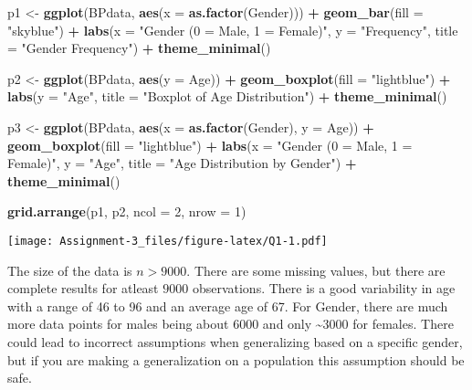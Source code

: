 \documentclass[
]{article}
\newenvironment{Shaded}{\begin{snugshade}}{\end{snugshade}}
\newcommand{\AttributeTok}[1]{\textcolor[rgb]{0.13,0.29,0.53}{#1}}
\newcommand{\DecValTok}[1]{\textcolor[rgb]{0.00,0.00,0.81}{#1}}
\newcommand{\FunctionTok}[1]{\textcolor[rgb]{0.13,0.29,0.53}{\textbf{#1}}}
\newcommand{\NormalTok}[1]{#1}
\newcommand{\OtherTok}[1]{\textcolor[rgb]{0.56,0.35,0.01}{#1}}
\newcommand{\SpecialCharTok}[1]{\textcolor[rgb]{0.81,0.36,0.00}{\textbf{#1}}}
\newcommand{\StringTok}[1]{\textcolor[rgb]{0.31,0.60,0.02}{#1}}
\begin{document}
\begin{Shaded}
\begin{Highlighting}[]
\NormalTok{p1 }\OtherTok{\textless{}{-}} \FunctionTok{ggplot}\NormalTok{(BPdata, }\FunctionTok{aes}\NormalTok{(}\AttributeTok{x =} \FunctionTok{as.factor}\NormalTok{(Gender))) }\SpecialCharTok{+}
  \FunctionTok{geom\_bar}\NormalTok{(}\AttributeTok{fill =} \StringTok{"skyblue"}\NormalTok{) }\SpecialCharTok{+}
  \FunctionTok{labs}\NormalTok{(}\AttributeTok{x =} \StringTok{"Gender (0 = Male, 1 = Female)"}\NormalTok{, }\AttributeTok{y =} \StringTok{"Frequency"}\NormalTok{, }\AttributeTok{title =} \StringTok{"Gender Frequency"}\NormalTok{) }\SpecialCharTok{+}
  \FunctionTok{theme\_minimal}\NormalTok{()}

\NormalTok{p2 }\OtherTok{\textless{}{-}} \FunctionTok{ggplot}\NormalTok{(BPdata, }\FunctionTok{aes}\NormalTok{(}\AttributeTok{y =}\NormalTok{ Age)) }\SpecialCharTok{+}
  \FunctionTok{geom\_boxplot}\NormalTok{(}\AttributeTok{fill =} \StringTok{"lightblue"}\NormalTok{) }\SpecialCharTok{+}
  \FunctionTok{labs}\NormalTok{(}\AttributeTok{y =} \StringTok{"Age"}\NormalTok{, }\AttributeTok{title =} \StringTok{"Boxplot of Age Distribution"}\NormalTok{) }\SpecialCharTok{+}
  \FunctionTok{theme\_minimal}\NormalTok{()}

\NormalTok{p3 }\OtherTok{\textless{}{-}} \FunctionTok{ggplot}\NormalTok{(BPdata, }\FunctionTok{aes}\NormalTok{(}\AttributeTok{x =} \FunctionTok{as.factor}\NormalTok{(Gender), }\AttributeTok{y =}\NormalTok{ Age)) }\SpecialCharTok{+}
  \FunctionTok{geom\_boxplot}\NormalTok{(}\AttributeTok{fill =} \StringTok{"lightblue"}\NormalTok{) }\SpecialCharTok{+}
  \FunctionTok{labs}\NormalTok{(}\AttributeTok{x =} \StringTok{"Gender (0 = Male, 1 = Female)"}\NormalTok{, }\AttributeTok{y =} \StringTok{"Age"}\NormalTok{, }\AttributeTok{title =} \StringTok{"Age Distribution by Gender"}\NormalTok{) }\SpecialCharTok{+}
  \FunctionTok{theme\_minimal}\NormalTok{()}

\FunctionTok{grid.arrange}\NormalTok{(p1, p2, }\AttributeTok{ncol =} \DecValTok{2}\NormalTok{, }\AttributeTok{nrow =} \DecValTok{1}\NormalTok{)}
\end{Highlighting}
\end{Shaded}

\texttt{[image: Assignment-3\_files/figure-latex/Q1-1.pdf]}

The size of the data is \(n>9000\). There are some missing values, but
there are complete results for atleast \(9000\) observations. There is a
good variability in age with a range of 46 to 96 and an average age of
67. For Gender, there are much more data points for males being about
\(6000\) and only \textasciitilde{}\(3000\) for females. There could
lead to incorrect assumptions when generalizing based on a specific
gender, but if you are making a generalization on a population this
assumption should be safe.
\end{document}
